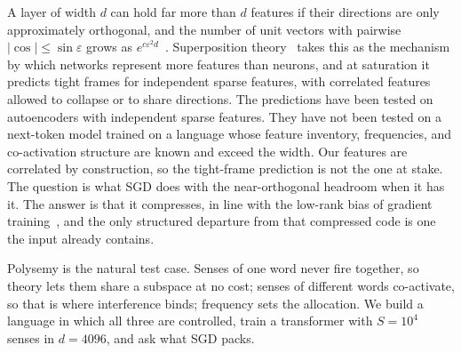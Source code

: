 \documentclass{article}
\begin{document}
A layer of width $d$ can hold far more than $d$ features if their directions are only
approximately orthogonal, and the number of unit vectors with pairwise
$|\cos|\le\sin\varepsilon$ grows as $e^{c\varepsilon^2
d}$~\citep{tao2013kl,garg2026features}. Superposition
theory~\citep{elhage2022toy,scherlis2022polysemanticity} takes this as the mechanism by
which networks represent more features than neurons, and at saturation it predicts
tight frames for independent sparse features, with correlated features allowed to
collapse or to share directions. The predictions have been tested on autoencoders
with independent sparse features. They have not been tested on a next-token model
trained on a language whose feature inventory, frequencies, and co-activation
structure are known and exceed the width. Our features are correlated by
construction, so the tight-frame prediction is not the one at stake. The question
is what SGD does with the near-orthogonal headroom when it has it. The answer is
that it compresses, in line with the low-rank bias of gradient
training~\citep{papyan2020collapse,ansuini2019intrinsic,huh2023lowrank}, and the
only structured departure from that compressed code is one the input already
contains.

Polysemy is the natural test case. Senses of one word never fire together, so theory
lets them share a subspace at no cost; senses of different words co-activate, so that
is where interference binds; frequency sets the allocation. We build a language in
which all three are controlled, train a transformer with $S{=}10^4$ senses in
$d{=}4096$, and ask what SGD packs.
\end{document}

